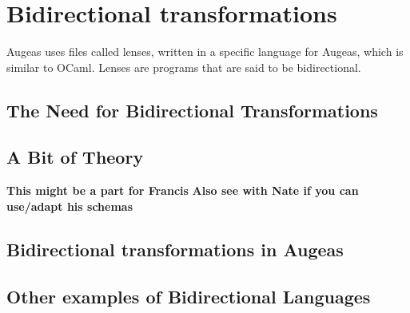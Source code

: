 \chapter{Bidirectional transformations}

\label{chap:bx}

Augeas uses files called lenses, written in a specific language for Augeas, which is similar to OCaml. Lenses are programs that are said to be bidirectional.

\section{The Need for Bidirectional Transformations}

\section{A Bit of Theory}

\textbf{This might be a part for Francis} \textbf{Also see with Nate if you can use/adapt his schemas}

\section{Bidirectional transformations in Augeas}

\section{Other examples of Bidirectional Languages}

